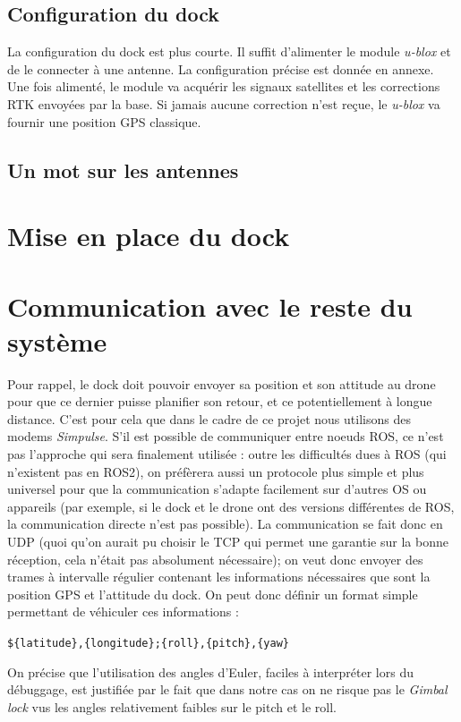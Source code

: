 \documentclass[12pt]{report}
\begin{document}
\subsection{Configuration du dock}
La configuration du dock est plus courte. Il suffit d'alimenter le module \textit{u-blox} et de le connecter à une antenne. La configuration précise est donnée en annexe. Une fois alimenté, le module va acquérir les signaux satellites et les corrections RTK envoyées par la base. 
Si jamais aucune correction n'est reçue, le \textit{u-blox} va fournir une position GPS classique.
\subsection{Un mot sur les antennes}

\section{Mise en place du dock}

\section{Communication avec le reste du système}

Pour rappel, le dock doit pouvoir envoyer sa position et son attitude au drone pour que ce dernier puisse planifier son retour, et ce potentiellement à longue distance.  C'est pour cela que dans le cadre de ce projet nous utilisons des modems \textit{Simpulse}. S'il est possible de communiquer entre noeuds ROS, ce n'est pas l'approche qui sera finalement utilisée : outre les difficultés dues à ROS (qui n'existent pas en ROS2), on préfèrera aussi un protocole plus simple et plus universel pour que la communication s'adapte facilement sur d'autres OS ou appareils (par exemple, si le dock et le drone ont des versions différentes de ROS, la communication directe n'est pas possible). La communication se fait donc en UDP (quoi qu'on aurait pu choisir le TCP qui permet une garantie sur la bonne réception, cela n'était pas absolument nécessaire); on veut donc envoyer des trames à intervalle régulier contenant les informations nécessaires que sont la position GPS et l'attitude du dock. On peut donc définir un format simple permettant de véhiculer ces informations :

\verb|${latitude},{longitude};{roll},{pitch},{yaw}|

On précise que l'utilisation des angles d'Euler, faciles à interpréter lors du débuggage, est justifiée par le fait que dans notre cas on ne risque pas le \textit{Gimbal lock} vus les angles relativement faibles sur le pitch et le roll.
\end{document}

